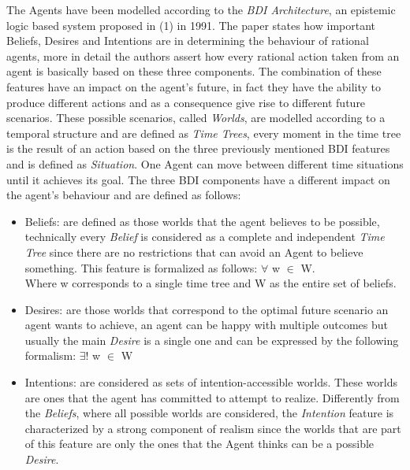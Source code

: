 \documentclass[a4paper]{article}
\begin{document}
The Agents have been modelled according to the \textit{BDI Architecture}, an epistemic logic based system proposed in (1) in 1991. The paper states how important Beliefs, Desires and Intentions are in determining the behaviour of rational agents, more in detail the authors assert how every rational action taken from an agent is basically based on these three components. The combination of these features have an impact on the agent's future, in fact they have the ability to produce different actions and as a consequence give rise to different future scenarios. These possible scenarios, called \textit{Worlds}, are modelled according to a temporal structure and are defined as \textit{Time Trees}, every moment in the time tree is the result of an action based on the three previously mentioned BDI features and is defined as \textit{Situation}. One Agent can move between different time situations until it achieves its goal. The three BDI components have a different impact on the agent's behaviour and are defined as follows: 

\begin{itemize}

\item Beliefs: are defined as those worlds that the agent believes to be possible, technically every \textit{Belief} is considered as a complete and independent \textit{Time Tree} since there are no restrictions that can avoid an Agent to believe something. This feature is formalized as follows: $\forall$ w $\in$ W. \\
Where w corresponds to a single time tree and W as the entire set of beliefs. 
\item Desires: are those worlds that correspond to the optimal future scenario an agent wants to achieve, an agent can be happy with multiple outcomes but usually the main \textit{Desire} is a single one and can be expressed by the following formalism: $\exists!$ w $\in$ W 
\item Intentions: are considered as sets of intention-accessible worlds. These worlds are ones that the agent has committed to attempt to realize. Differently from the \textit{Beliefs}, where all possible worlds are considered, the \textit{Intention} feature is characterized by a strong component of realism since the worlds that are part of this feature are only the ones that the Agent thinks can be a possible \textit{Desire}. 

\end{itemize} 
\end{document}
